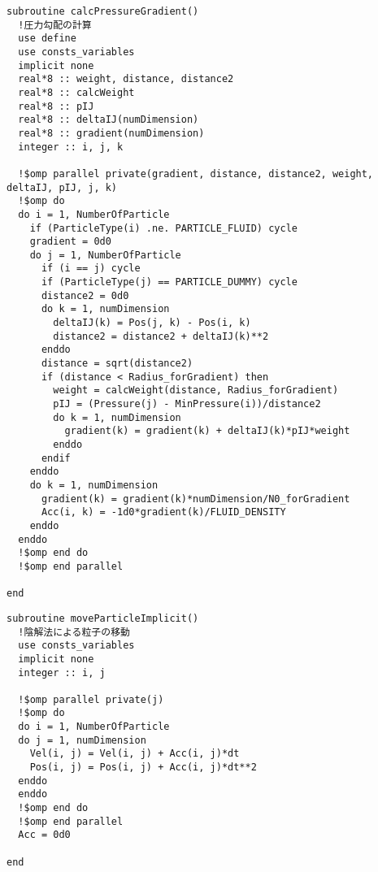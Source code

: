 \begin{lstlisting}[caption=圧力勾配計算ルーチン]
subroutine calcPressureGradient()
  !圧力勾配の計算
  use define
  use consts_variables
  implicit none
  real*8 :: weight, distance, distance2
  real*8 :: calcWeight
  real*8 :: pIJ
  real*8 :: deltaIJ(numDimension)
  real*8 :: gradient(numDimension)
  integer :: i, j, k

  !$omp parallel private(gradient, distance, distance2, weight, deltaIJ, pIJ, j, k)
  !$omp do
  do i = 1, NumberOfParticle
    if (ParticleType(i) .ne. PARTICLE_FLUID) cycle
    gradient = 0d0
    do j = 1, NumberOfParticle
      if (i == j) cycle
      if (ParticleType(j) == PARTICLE_DUMMY) cycle
      distance2 = 0d0
      do k = 1, numDimension
        deltaIJ(k) = Pos(j, k) - Pos(i, k)
        distance2 = distance2 + deltaIJ(k)**2
      enddo
      distance = sqrt(distance2)
      if (distance < Radius_forGradient) then
        weight = calcWeight(distance, Radius_forGradient)
        pIJ = (Pressure(j) - MinPressure(i))/distance2
        do k = 1, numDimension
          gradient(k) = gradient(k) + deltaIJ(k)*pIJ*weight
        enddo
      endif
    enddo
    do k = 1, numDimension
      gradient(k) = gradient(k)*numDimension/N0_forGradient
      Acc(i, k) = -1d0*gradient(k)/FLUID_DENSITY
    enddo
  enddo
  !$omp end do
  !$omp end parallel

end
\end{lstlisting}
\begin{lstlisting}[caption=速度・位置計算ルーチン]
subroutine moveParticleImplicit()
  !陰解法による粒子の移動
  use consts_variables
  implicit none
  integer :: i, j

  !$omp parallel private(j)
  !$omp do
  do i = 1, NumberOfParticle
  do j = 1, numDimension
    Vel(i, j) = Vel(i, j) + Acc(i, j)*dt
    Pos(i, j) = Pos(i, j) + Acc(i, j)*dt**2
  enddo
  enddo
  !$omp end do
  !$omp end parallel
  Acc = 0d0

end
\end{lstlisting}